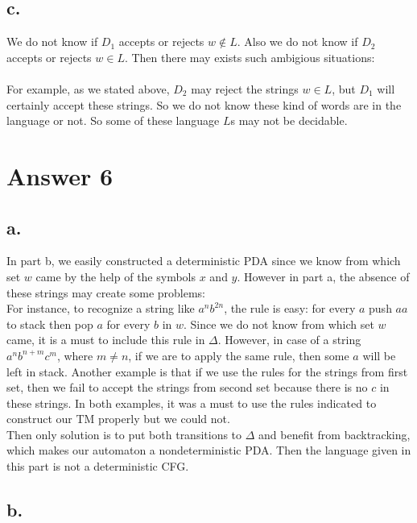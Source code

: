 \documentclass[12pt]{article}
\begin{document}
\subsection*{c.}

We do not know if $D_1$ accepts or rejects $w \notin L$. Also we do not know if $D_2$ 
accepts or rejects $w \in L$. Then there may exists such ambigious situations:\\ \\

For example, as we stated above, $D_2$ may reject the strings $w \in L$, but $D_1$ will 
certainly accept these strings. So we do not know these kind of words are in the language 
or not. So some of these language $L$s may not be decidable.

\section*{Answer 6}

\subsection*{a.}

In part b, we easily constructed a deterministic PDA since we know from which set $w$
came by the help of the symbols $x$ and $y$. However in part a, the absence of these 
strings may create some problems:\\
    For instance, to recognize a string like $a^nb^{2n}$, the rule is easy: for every $a$
push $aa$ to stack then pop $a$ for every $b$ in $w$. Since we do not know from 
which set $w$ came, it is a must to include this rule in $\Delta$. However, in case of 
a string $a^nb^{n+m}c^m$, where $m \neq n$, if we are to apply the same rule, then some
 $a$ will be left in stack. Another example is that if we use the rules for the strings 
from first set, then we fail to accept the strings from second set because there is no 
$c$ in these strings. In both examples, it was a must to use the rules indicated to 
construct our TM properly but we could not.\\
Then only solution is to put both transitions to $\Delta$ and benefit from backtracking, 
which makes our automaton a nondeterministic PDA. Then the language given in this part 
is not a deterministic CFG. 

\subsection*{b.}
\end{document}

